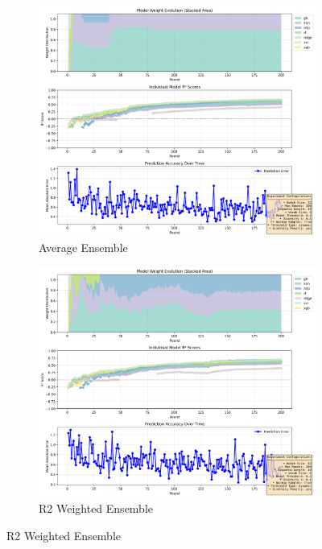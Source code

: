 \documentclass[conference]{IEEEtran}
\begin{document}
\begin{figure}[htbp]
    \centering
    
    \begin{subfigure}[b]{0.8\linewidth}
        \includegraphics[width=\linewidth]{images/model_evolution_r200_b32_l10_average.png}
        \caption{Average Ensemble}
        \label{fig:average_model}
    \end{subfigure}
    
    \vspace{1em} %

    \begin{subfigure}[b]{0.8\linewidth}
        \includegraphics[width=\linewidth]{images/model_evolution_r200_b32_l10_weight.png}
        \caption{R2 Weighted Ensemble}
        \label{fig:weight_model}
    \end{subfigure}
    

\end{figure}
\end{document}
